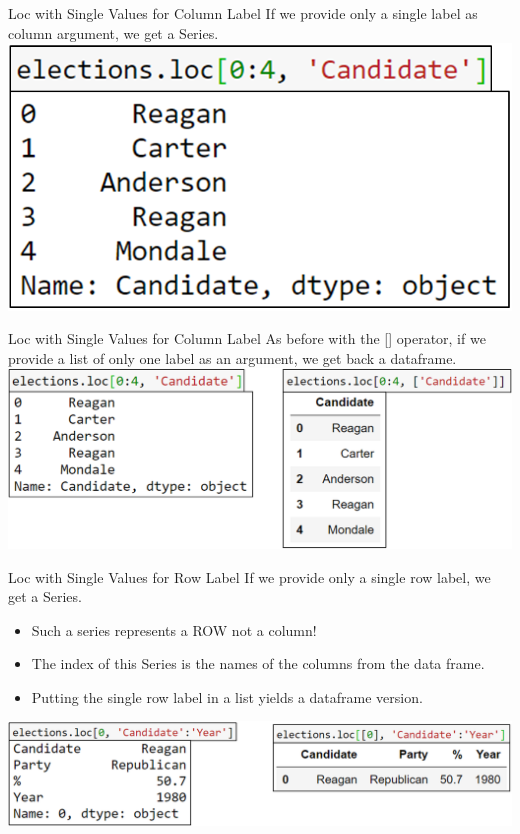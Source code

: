 \documentclass[aspectratio=169]{../latex_main/tntbeamer}  %
\begin{document}
	
	\begin{frame}{Loc with Single Values for Column Label}
	   If we provide only a single label as column argument, we get a Series.
	    \includegraphics[scale=.5]{Bild28}
	\end{frame}
	
	
	\begin{frame}{Loc with Single Values for Column Label}
	   As before with the [] operator, if we provide a list of only one label as an argument, we get back a dataframe.
	    \includegraphics[scale=.4]{Bild29}
	\end{frame}
	
	\begin{frame}{Loc with Single Values for Row Label}
	   If we provide only a single row label, we get a Series.
	   \begin{itemize}
	       \item Such a series represents a ROW not a column!
	       \item The index of this Series is the names of the columns from the data frame.
	       \item Putting the single row label in a list yields a dataframe version.
	   \end{itemize}
	    \includegraphics[scale=.4]{Bild30}
	\end{frame}
	
\end{document}
